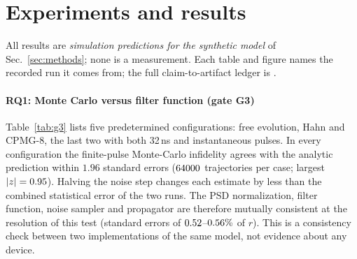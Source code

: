 \section{Experiments and results}
\label{sec:results}

All results are \emph{simulation predictions for the synthetic model} of
Sec.~\ref{sec:methods}; none is a measurement. Each table and figure names the recorded
run it comes from; the full claim-to-artifact ledger is .

\paragraph{RQ1: Monte Carlo versus filter function (gate G3)}
Table~\ref{tab:g3} lists five predetermined configurations: free evolution, Hahn and CPMG-8, the
last two with both 32\,ns and instantaneous pulses. In every configuration the finite-pulse
Monte-Carlo infidelity agrees with the analytic prediction within $1.96$ standard errors
($64000$ trajectories per case; largest $|z|=0.95$). Halving the noise step changes
each estimate by less than the combined statistical error of the two runs. The PSD normalization, filter function,
noise sampler and propagator are therefore mutually consistent at the resolution of this test
(standard errors of $0.52$--$0.56\%$ of $r$). This is a consistency check between two implementations of the same model, not
evidence about any device.



